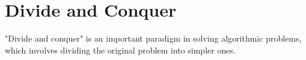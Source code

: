 \section{Divide and Conquer}
\label{addDivideAndConquer}
"Divide and conquer" is an important paradigm in solving algorithmic problems, which involves dividing the original problem into simpler ones.
